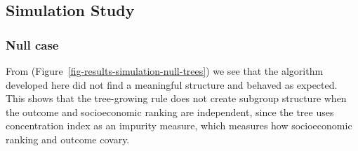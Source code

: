 \documentclass[
  11pt,
  a4paper,
]{article}
\begin{document}
\subsection{Simulation Study}\label{simulation-study}

\subsubsection{Null case}\label{null-case}

From (Figure~\ref{fig-results-simulation-null-trees}) we see that the
algorithm developed here did not find a meaningful structure and behaved
as expected. This shows that the tree-growing rule does not create
subgroup structure when the outcome and socioeconomic ranking are
independent, since the tree uses concentration index as an impurity
measure, which measures how socioeconomic ranking and outcome covary.
\end{document}
